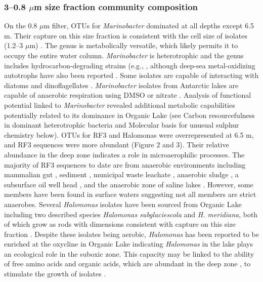 {{\subsubsection{3--0.8 $\mu$m size fraction community composition}
On the 0.8 $\mu$m filter, \acp{OTU} for \emph{Marinobacter} dominated at all depths except 6.5 m. 
Their capture on this size fraction is consistent with the cell size of isolates (1.2--3 $\mu$m) \cite{Gauthier1992}. 
The genus is metabolically versatile, which likely permits it to occupy the entire water column. 
\emph{Marinobacter} is heterotrophic and the genus includes hydrocarbon-degrading strains (e.g., \citet{Gauthier1992, Huu1999}, although deep-sea metal-oxidizing autotrophs have also been reported \cite{Edwards2003}. 
Some isolates are capable of interacting with diatoms \cite{Gardes2010} and dinoflagellates \cite{Green2006}. 
\emph{Marinobacter} isolates from Antarctic lakes are capable of anaerobic respiration using \ac{DMSO} \cite{Matsuzaki2006} or nitrate \cite{Ward1997}. 
Analysis of functional potential linked to \emph{Marinobacter} revealed additional metabolic capabilities potentially related to its dominance in Organic Lake 
(see Carbon resourcefulness in dominant heterotrophic bacteria and Molecular basis for unusual sulphur chemistry below).%
\acp{OTU} for RF3 and Halomonas were overrepresented at 6.5 m, and RF3 sequences were more abundant (Figure 2 and 3). 
Their relative abundance in the deep zone indicates a role in microaerophilic processes. 
The majority of RF3 sequences to date are from anaerobic environments including mammalian gut \cite{Tajima1999, Ley2006, Samsudin2011}, sediment \cite{Yanagibayashi1999, Roske2012}, municipal waste leachate \cite{Huang2005}, anaerobic sludge \cite{Chouari2005, Goberna2009, Riviere2009, Tang2011}, a subsurface oil well head \cite{Yamane2011}, and the anaerobic zone of saline lakes \cite{Humayoun2003, Schmidtova2009, Bowman2000}. 
However, some members have been found in surface waters \cite{Demergasso2008, Xing2009, Yilmaz2012} suggesting not all members are strict anaerobes. 
Several \emph{Halomonas} isolates have been sourced from Organic Lake including two described species \emph{Halomonas subglaciescola} and \emph{H. meridiana}, both of which grow as rods with dimensions consistent with capture on this size fraction \cite{Franzmann1987a, James1990}. 
Despite these isolates being aerobic, \emph{Halomonas} has been reported to be enriched at the oxycline in Organic Lake \cite{James1994} indicating \emph{Halomonas} in the lake plays an ecological role in the suboxic zone. 
This capacity may be linked to the ability of free amino acids and organic acids, which are abundant in the deep zone \cite{Gibson1994}, to stimulate the growth of isolates \cite{Franzmann1987a}.

}}
